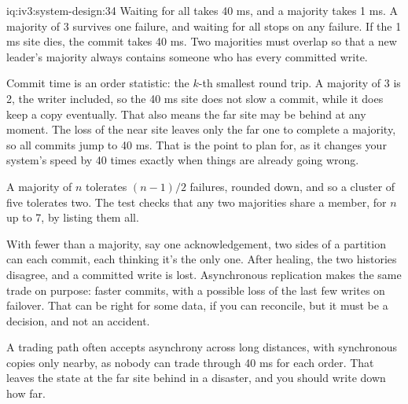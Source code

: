 \begin{solution}{iq:iv3:system-design:34}
Waiting for all takes 40 ms, and a majority takes 1 ms. A majority of 3 survives one failure, and waiting for all stops on any failure. If the 1 ms site dies, the commit takes 40 ms. Two majorities must overlap so that a new leader's majority always contains someone who has every committed write.
\label{lst:iv3:sd:quorum}

Commit time is an order statistic: the $k$-th smallest round trip. A majority of 3 is 2, the writer included, so the 40 ms site does not slow a commit, while it does keep a copy eventually. That also means the far site may be behind at any moment. The loss of the near site leaves only the far one to complete a majority, so all commits jump to 40 ms. That is the point to plan for, as it changes your system's speed by 40 times exactly when things are already going wrong.

A majority of $n$ tolerates $(n-1)/2$ failures, rounded down, and so a cluster of five tolerates two. The test checks that any two majorities share a member, for $n$ up to 7, by listing them all.

With fewer than a majority, say one acknowledgement, two sides of a partition can each commit, each thinking it's the only one. After healing, the two histories disagree, and a committed write is lost. Asynchronous replication makes the same trade on purpose: faster commits, with a possible loss of the last few writes on failover. That can be right for some data, if you can reconcile, but it must be a decision, and not an accident.

A trading path often accepts asynchrony across long distances, with synchronous copies only nearby, as nobody can trade through 40 ms for each order. That leaves the state at the far site behind in a disaster, and you should write down how far.

\end{solution}

